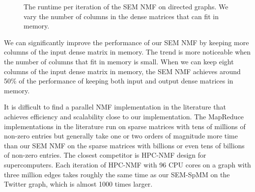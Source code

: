\begin{figure}
	\begin{center}
		\footnotesize
		
		\caption{The runtime per iteration of the SEM NMF on directed graphs.
			We vary the number of columns in the dense matrices that can fit
		in memory.}
		\label{perf:NMF}
	\end{center}
\end{figure}

We can significantly improve the performance of our SEM NMF by keeping more columns
of the input dense matrix in memory. The trend is more noticeable when the number of
columns that fit in memory is small. When we can keep eight columns of the input
dense matrix in memory, the SEM NMF achieves around 50\% of the performance of keeping
both input and output dense matrices in memory.

It is difficult to find a parallel NMF implementation in the literature that
achieves efficiency and scalability close to our implementation. The MapReduce
implementations in the literature \cite{Liao14, Yin14, Liu10} run on sparse
matrices with tens of millions of non-zero entries but generally take
one or two orders of magnitude more time than our SEM NMF on the sparse matrices
with billions or even tens of billions of non-zero entries. The closest competitor
is HPC-NMF \cite{Kannan16} design for supercomputers. Each iteration of HPC-NMF
with 96 CPU cores on a graph with three million edges takes roughly the same time
as our SEM-SpMM on the Twitter graph, which is almost 1000 times larger.

